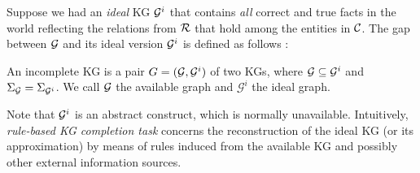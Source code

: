 Suppose we had an \emph{ideal} KG $\mathcal{G}^i$ that contains \emph{all} correct and true facts in the world reflecting the relations from $\mathcal{R}$ that hold among the entities in $\mathcal{C}$. The gap between $\mathcal{G}$ and its ideal version $\mathcal{G}^i$ is defined as follows \cite{rdfcomp}: 

\begin{definition} An incomplete KG is a pair
    $G = (\mathcal{G}, \mathcal{G}^i)$ of two KGs, where $\mathcal{G}\subseteq \mathcal{G}^i$ and
    $\Sigma_{\mathcal{G}}=\Sigma_{\mathcal{G}^i}$. We call $\mathcal{G}$ the available
    graph and $\mathcal{G}^i$ the ideal graph.
\end{definition}
    
Note that $\mathcal{G}^i$ is an abstract construct, which is normally unavailable. Intuitively, \emph{rule-based KG completion task} concerns the reconstruction of the ideal KG (or its approximation) by means of rules induced from the available KG and possibly other external information sources.

